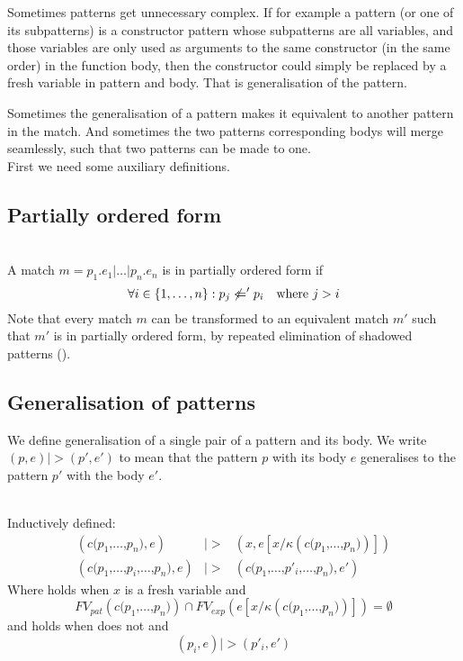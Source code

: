 Sometimes patterns get unnecessary complex. If for example a pattern (or one of
its subpatterns) is a constructor pattern whose subpatterns are all variables,
and those variables are only used as arguments to the same constructor (in the
same order) in the function body, then the constructor could simply be replaced
by a fresh variable in pattern and body. That is generalisation of the pattern.

Sometimes the generalisation of a pattern makes it equivalent to another pattern
in the match. And sometimes the two patterns corresponding bodys will merge
seamlessly, such that two patterns can be made to one.
\\[1em]
First we need some auxiliary definitions.

\subsection{Partially ordered form}
\begin{definition}\ \\
  \label{def:part-order-form}
  A match $m = p_1\texttt{.}e_1\texttt{|}\ldots\texttt{|}p_n\texttt{.}e_n$ is in
  partially ordered form if
  \[
  \forall i \in \{1, \ldots, n\} : p_j \not <=' p_i \quad \textnormal{where $j > i$}
  \]
  Note that every match $m$ can be transformed to an equivalent match $m'$ such
  that $m'$ is in partially ordered form, by repeated elimination of shadowed
  patterns ().
\end{definition}

\subsection{Generalisation of patterns}
We define generalisation of a single pair of a pattern and its body. We write
$(p, e) |> (p', e')$ to mean that the pattern $p$ with its body $e$ generalises
to the pattern $p'$ with the body $e'$.

\begin{definition}\ \\
  \label{def:gener-patt}
  Inductively defined:
  \begin{eqnarray}
    (c \texttt{(} p_1 \texttt{,} \ldots \texttt{,} p_n \texttt{)} , e) &|>& (x , e[x
    / \kappa (c \texttt{(} p_1 \texttt{,} \ldots \texttt{,} p_n \texttt{)} )]) 
    \label{eq:single-gen-1}\\
    (c \texttt{(} p_1 \texttt{,} \ldots \texttt{,} p_i \texttt{,} \ldots
    \texttt{,} p_n \texttt{)}, e) &|>&
    (c \texttt{(} p_1 \texttt{,} \ldots \texttt{,} p'_i \texttt{,} \ldots
    \texttt{,} p_n \texttt{)}, e') \label{eq:single-gen-2}
  \end{eqnarray}
  Where  holds when $x$ is a fresh variable and
  \[
  FV_{pat}(c\texttt{(}p_1\texttt{,}\ldots\texttt{,}p_n\texttt{)}) \cap FV_{exp}(e[x/\kappa
  (c\texttt{(}p_1\texttt{,}\ldots\texttt{,}p_n\texttt{)})]) = \emptyset
  \]
  and  holds when  does not and
  \[
  (p_i , e) |> (p'_i , e')
  \]
\end{definition}

